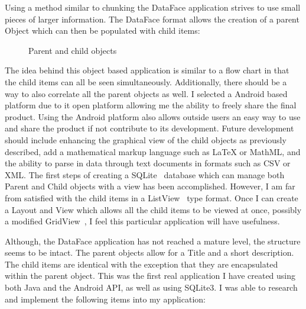 \documentclass[fontsize=11pt, %
paper=a4, %
twoside, %
captions=tableheading,
index=totoc,
hyperref]{labbook}
\begin{document}
\begin{onehalfspace}
Using a method similar to chunking the DataFace application strives to use small pieces of larger information. The DataFace format allows the creation of a parent Object which can then be populated with child items:
\end{onehalfspace}
\begin{figure}[H]
\centering
{}
\caption{Parent and child objects}
\end{figure}
\begin{onehalfspace}
	The idea behind this object based application is similar to a flow chart in that the child items can all be seen simultaneously. Additionally, there should be a way to also correlate all the parent objects as well. I selected a Android based platform due to it open platform allowing me the ability to freely share the final product. Using the Android platform also allows outside users an easy way to use and share the product if not contribute to its development. Future development should include enhancing the graphical view of the child objects as previously described, add a mathematical markup language such as LaTeX or MathML, and the ability to parse in data through text documents in formats such as CSV or XML. The first steps of creating a SQLite~\citep{sqlite} database which can manage both Parent and Child objects with a view has been accomplished. However, I am far from satisfied with the child items in a ListView~\citep{ListView} type format. Once I can create a Layout and View which allows all the child items to be viewed at once, possibly a modified GridView~\citep{gridview}, I feel this particular application will have usefulness. 
\end{onehalfspace}
\begin{onehalfspace}
Although, the DataFace application has not reached a mature level, the structure seems to be intact. The parent objects allow for a Title and a short description. The child items are identical with the exception that they are encapsulated within the parent object. This was the first real application I have created using both Java and the Android API, as well as using SQLite3. I was able to research and implement the following items into my application:
\end{onehalfspace}
\end{document}
